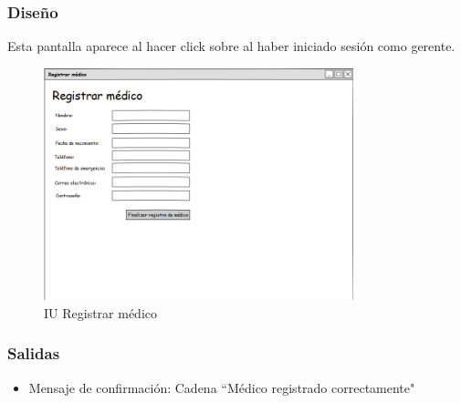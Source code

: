 \subsubsection{Diseño}
Esta pantalla aparece al hacer click sobre  al haber iniciado sesión como gerente.

\begin{figure}[htbp!]
	\centering
	\includegraphics[width=0.8\textwidth]{images/IU_registrar_medico}
	\caption{IU Registrar médico}
\end{figure}


\subsubsection{Salidas}
\begin{itemize} 
	\item Mensaje de confirmación: Cadena ``Médico registrado correctamente"
\end{itemize}
